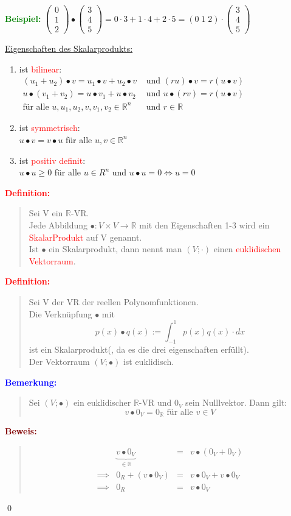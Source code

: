\documentclass{article}
\newcommand{\red}[1]{\textcolor{red}{#1}}
\newcommand{\blue}[1]{\textcolor{blue}{#1}}
\newcommand{\green}[1]{\textcolor{green}{#1}}
\newcommand{\maroon}[1]{\textcolor{maroon}{#1}}
\newcommand{\ex}{\green{\textbf{Beispiel: }}}
\newcommand{\de}[1]{\red{\textbf{Definition: }}\begin{quote}#1\end{quote}}
\newcommand{\an}[1]{\blue{\textbf{Bemerkung: }}\begin{quote}#1\end{quote}}
\newcommand{\pr}[1]{\maroon{\textbf{Beweis: }}\begin{quote}#1\end{quote}\qed}
\newcommand{\R}{\mathbb{R}}
\newcommand{\vvvec}[3]{\begin{pmatrix}#1\\#2\\#3\end{pmatrix}}
\begin{document}
\ex $\vvvec{0}{1}{2} \bullet \vvvec{3}{4}{5} = 0 \cdot 3 + 1 \cdot 4 + 2 \cdot 5 = (0 \; 1 \; 2) \cdot \vvvec{3}{4}{5}$

\underline{Eigenschaften des Skalarprodukts:}

\begin{enumerate}
    \item ist \red{bilinear}:\\
    $
    \begin{array}{lll}
        (u_1 + u_2) \bullet v = u_1 \bullet v + u_2 \bullet v &\text{ und } (ru) \bullet v = r (u \bullet v)\\
        u \bullet (v_1 + v_2) = u \bullet v_1 + u \bullet v_2 &\text{ und } u \bullet (rv) = r (u \bullet v)\\
        \text{für alle } u, u_1, u_2, v, v_1, v_2 \in \R^n &\text{ und } r \in \R
    \end{array}
    $
    \item ist \red{symmetrisch}:\\
    $u \bullet v = v \bullet u$ für alle $u, v \in \R^n$
    \item ist \red{positiv definit}:\\
    $u \bullet u \ge 0$ für alle $u \in R^n$ und $u \bullet u = 0 \iff u = 0$
\end{enumerate}

\de{
    Sei V ein $\R$-VR.\\
    Jede Abbildung $\bullet: V \times V \to \R$ mit den Eigenschaften 1-3 wird ein \red{SkalarProdukt} auf V genannt.\\
    Ist $\bullet$ ein Skalarprodukt, dann nennt man $(V; \cdot)$ einen \red{euklidischen Vektorraum}.
}

\de{
    Sei V der VR der reellen Polynomfunktionen.\\
    Die Verknüpfung $\bullet$ mit
    \[
        p(x) \bullet q(x) := \int_{-1}^{1} p(x)q(x) \cdot dx    
    \]
    ist ein Skalarprodukt(, da es die drei eigenschaften erfüllt).\\
    Der Vektorraum $(V; \bullet)$ ist euklidisch.
}

\an{
    Sei $(V; \bullet)$ ein euklidischer $\R$-VR und $0_V$ sein Nulllvektor. Dann gilt:
    \[
        v \bullet 0_V = 0_\R \text{ für alle } v \in V
    \]
}
\pr{
    \vspace{-3em}
    \begin{align*}
        \phantom{\implies}& \underbrace{v \bullet 0_V}_{\in \R} &=& v \bullet (0_V + 0_V)\\
        \implies& 0_R + (v \bullet 0_V) &=& v \bullet 0_V + v \bullet 0_V\\
        \implies& 0_R &=& v \bullet 0_V 
    \end{align*}
}
\end{document}
